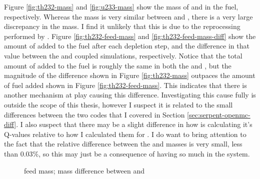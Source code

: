 Figure \ref{fig:th232-mass} and \ref{fig:u233-mass} show the mass of   and
 in the fuel, respectively. Whereas the  mass is very similar
between \OpenMC and \SerpentTWO, there is a very large discrepancy in the 
mass. I find it unlikely that this is due to the reprocessing performed by \SaltProc.
Figure \ref{fig:th232-feed-mass} and \ref{fig:th232-feed-mass-diff} show the 
amount of  added to the fuel after each depletion step, and the
difference in that value between the \OpenMC and \SerpentTWO coupled simulations,
respectively. Notice that the total amount of  added to the fuel
is roughly the same in both the \OpenMC and \SerpentTWO, but the magnitude
of the difference shown in Figure \ref{fig:th232-mass} outpaces the amount of fuel
added shown in Figure \ref{fig:th232-feed-mass}. This indicates that there is another
mechanism at play causing this difference. Investigating this cause fully is outside the
scope of this thesis, however I suspect it is related to the small differences between the two
codes that I covered in Section \ref{sec:serpent-openmc-diff}.
I also suspect that there may be a slight difference in how \SerpentTWO is calculating it's
Q-values relative to how I calculated them for \OpenMC. I do want to bring attention to the fact
that the relative difference between the \OpenMC and \SerpentTWO {} masses is very small,
less than 0.03\%, so this may just be a consequence of having so much  in the system.


\begin{figure}[htpb]
    \centering
    \caption[ feed mass]{
      feed mass;
      mass difference between \OpenMC and \SerpentTWO}
    \label{fig:cm242-mass}
\end{figure}

